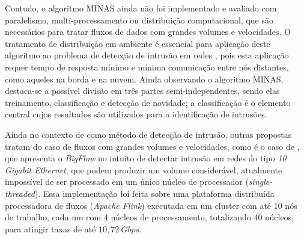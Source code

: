 Contudo, o algoritmo MINAS ainda não foi implementado e avaliado com paralelismo,
multi-processamento ou distribuição computacional, que são necessários para
tratar fluxos de dados com grandes volumes e velocidades.
O tratamento de distribuição em ambiente \fog é essencial para aplicação deste
algoritmo ao problema de detecção de intrusão em redes \iot, pois esta aplicação
requer tempo de resposta mínimo e mínima comunicação entre nós distantes, como
aqueles na borda e na nuvem.
Ainda observando o algoritmo MINAS, destaca-se a possível divisão em três partes
semi-independentes, sendo elas treinamento, classificação e detecção de
novidade; a classificação é o elemento central cujos resultados são utilizados
para a identificação de intrusões.

Ainda no contexto de \nd como método de detecção de intrusão,
outras propostas tratam do caso de fluxos com grandes volumes e velocidades, como é o caso
de , que apresenta o \emph{BigFlow} no intuito de detectar
intrusão em redes do tipo \emph{10 Gigabit Ethernet}, que podem produzir um volume considerável,
atualmente impossível de ser processado em um único núcleo de processador
(\emph{single-threaded}).
Essa implementação foi feita sobre uma plataforma
distribuída processadora de fluxos (\emph{Apache Flink}) executada em um cluster
com até 10 nós de trabalho, cada um com 4 núcleos de processamento, totalizando
40 núcleos, para atingir taxas de até $10,72 \ Gbps$.


